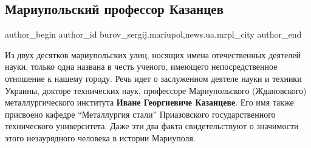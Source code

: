  
 
 
 
 
 
\subsection{Мариупольский профессор Казанцев}
\label{sec:18_05_2019.stz.news.ua.mrpl_city.1.mariupol_professor_kazancev}
 
\ifcmt
 author_begin
   author_id burov_sergij.mariupol,news.ua.mrpl_city
 author_end
\fi


Из двух десятков мариупольских улиц, носящих имена отечественных деятелей
науки, только одна названа в честь ученого, имеющего непосредственное отношение
к нашему городу. Речь идет о заслуженном деятеле науки и техники Украины,
докторе технических наук, профессоре Мариупольского (Ждановского)
металлургического института \textbf{Иване Георгиевиче Казанцеве}. Его имя также
присвоено кафедре \enquote{Металлургия стали} Приазовского государственного
технического университета. Даже эти два факта свидетельствуют о значимости
этого незаурядного человека в истории Мариуполя.

